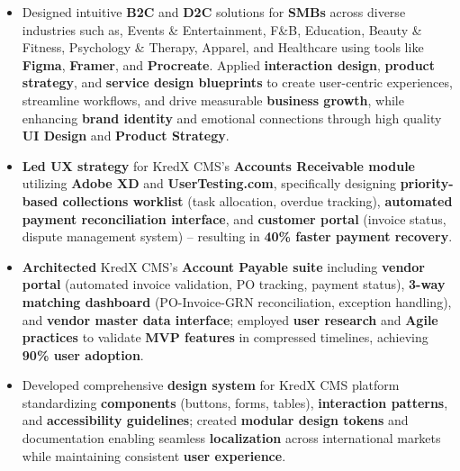 \documentclass[10pt,a4paper,ragged2e,withhyper]{altacv}
\begin{document}
\begin{paracol}{2}


\begin{itemize}
  \item Designed intuitive \textbf{B2C} and \textbf{D2C} solutions for \textbf{SMBs} across diverse industries such as, Events \& Entertainment, F\&B, Education, Beauty \& Fitness, Psychology \& Therapy, Apparel, and Healthcare using tools like \textbf{Figma}, \textbf{Framer}, and \textbf{Procreate}. Applied \textbf{interaction design}, \textbf{product strategy}, and \textbf{service design blueprints} to create user-centric experiences, streamline workflows, and drive measurable \textbf{business growth}, while enhancing \textbf{brand identity} and emotional connections through high quality \textbf{UI Design} and \textbf{Product Strategy}.
\end{itemize}

\divider

\begin{itemize}
  \item \textbf{Led UX strategy} for KredX CMS's \textbf{Accounts Receivable module} utilizing \textbf{Adobe XD} and \textbf{UserTesting.com}, specifically designing \textbf{priority-based collections worklist} (task allocation, overdue tracking), \textbf{automated payment reconciliation interface}, and \textbf{customer portal} (invoice status, dispute management system) – resulting in \textbf{40\% faster payment recovery}.
  
  \item \textbf{Architected} KredX CMS's \textbf{Account Payable suite} including \textbf{vendor portal} (automated invoice validation, PO tracking, payment status), \textbf{3-way matching dashboard} (PO-Invoice-GRN reconciliation, exception handling), and \textbf{vendor master data interface}; employed \textbf{user research} and \textbf{Agile practices} to validate \textbf{MVP features} in compressed timelines, achieving \textbf{90\% user adoption}.
  
  \item Developed comprehensive \textbf{design system} for KredX CMS platform standardizing \textbf{components} (buttons, forms, tables), \textbf{interaction patterns}, and \textbf{accessibility guidelines}; created \textbf{modular design tokens} and documentation enabling seamless \textbf{localization} across international markets while maintaining consistent \textbf{user experience}.
  

\end{itemize}
\end{paracol}
\end{document}
